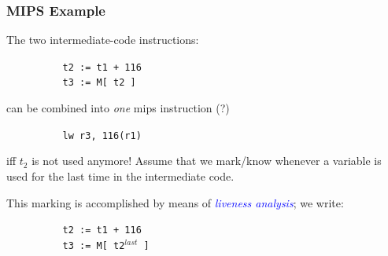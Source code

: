 \documentclass{beamer}
\newcommand{\blue}[1]{\textcolor{Blue}{{#1}}}
\renewcommand{\emph}[1]{\textcolor{structure}{#1}}
\newcommand{\emp}[1]{\textcolor{DikuRed}{ #1}}
\begin{document}
\begin{frame}[fragile,t]
   \frametitle{MIPS Example}

\bigskip

The two intermediate-code instructions:
\smallskip

\emp{\tt~~~~~~~~~~t2 := t1 + 116}\\
\emp{\tt~~~~~~~~~~t3 := M[ t2 ]}

\bigskip

can be combined into {\em one} {\sc mips} instruction (?)
\smallskip

\emph{\tt~~~~~~~~~~lw r3, 116(r1)}

\bigskip

\emph{{\sc iff} $t_2$ is not used anymore}! Assume that we mark/know whenever a 
        variable is used for the last time in the intermediate code.
\bigskip

This marking is accomplished by means of \blue{\em liveness analysis}; we write:
\smallskip

\emp{\tt~~~~~~~~~~t2 := t1 + 116}\\
\emp{\tt~~~~~~~~~~t3 := M[ t2$^{last}$ ]}

\end{frame}
\end{document}
